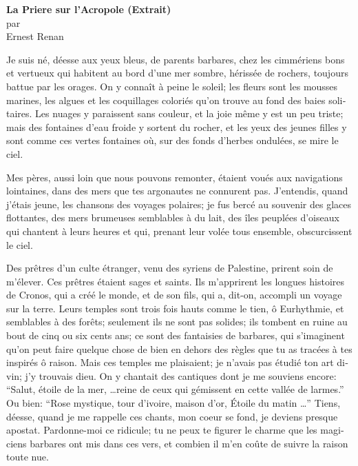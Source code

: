 \begin{center}\textbf{La Priere sur l'Acropole (Extrait)} \\ par \\ Ernest Renan \end{center} 
\begin{otherlanguage}{french} 
Je suis né, déesse aux yeux bleus, de parents barbares, chez les cimmériens bons et vertueux qui habitent au bord d'une mer sombre, hérissée de rochers, toujours battue par les orages. On y connaît à peine le soleil; les fleurs sont les mousses marines, les algues et les coquillages coloriés qu'on trouve au fond des baies solitaires. Les nuages y paraissent sans couleur, et la joie même y est un peu triste; mais des fontaines d'eau froide y sortent du rocher, et les yeux des jeunes filles y sont comme ces vertes fontaines où, sur des fonds d'herbes ondulées, se mire le ciel.

Mes pères, aussi loin que nous pouvons remonter, étaient voués aux navigations lointaines, dans des mers que tes argonautes ne connurent pas. J'entendis, quand j'étais jeune, les chansons des voyages polaires; je fus bercé au souvenir des glaces flottantes, des mers brumeuses semblables à du lait, des îles peuplées d'oiseaux qui chantent à leurs heures et qui, prenant leur volée tous ensemble, obscurcissent le ciel.

Des prêtres d'un culte étranger, venu des syriens de Palestine, prirent soin de m'élever. Ces prêtres étaient sages et saints. Ils m'apprirent les longues histoires de Cronos, qui a créé le monde, et de son fils, qui a, dit-on, accompli un voyage sur la terre. Leurs temples sont trois fois hauts comme le tien, ô Eurhythmie, et semblables à des forêts; seulement ils ne sont pas solides; ils tombent en ruine au bout de cinq ou six cents ans; ce sont des fantaisies de barbares, qui s'imaginent qu'on peut faire quelque chose de bien en dehors des règles que tu as tracées à tes inspirés ô raison. Mais ces temples me plaisaient; je n'avais pas étudié ton art divin; j'y trouvais dieu. On y chantait des cantiques dont je me souviens encore: ``Salut, étoile de la mer, \ldots reine de ceux qui gémissent en cette vallée de larmes.'' Ou bien: ``Rose mystique, tour d'ivoire, maison d'or, Étoile du matin \ldots'' Tiens, déesse, quand je me rappelle ces chants, mon coeur se fond, je deviens presque apostat. Pardonne-moi ce ridicule; tu ne peux te figurer le charme que les magiciens barbares ont mis dans ces vers, et combien il m'en coûte de suivre la raison toute nue.
\end{otherlanguage}